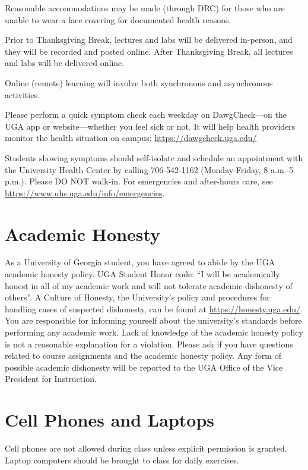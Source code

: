 \documentclass[12pt]{article}
\begin{document}
Reasonable accommodations may be made (through DRC) for those who are
unable to wear a face covering for documented health reasons. 

Prior to Thanksgiving Break, lectures and labs will be delivered
in-person, and they will be recorded and posted online. After
Thanksgiving Break, all lectures and labs will be delivered online. 

Online (remote) learning will involve both synchronous and
asynchronous activities.


Please perform a quick symptom check each weekday on DawgCheck—on the
UGA app or website—whether you feel sick or not. It will help health
providers monitor the health situation on campus:
\url{https://dawgcheck.uga.edu/}


Students showing symptoms should self-isolate and schedule an
appointment with the University Health Center by calling 706-542-1162
(Monday-Friday, 8 a.m.-5 p.m.). Please DO NOT walk-in. For emergencies
and after-hours care, see
\url{https://www.uhs.uga.edu/info/emergencies}.  



\vspace{-2mm}
\section*{\normalsize Academic Honesty}
\vspace{-4mm}
As a University of Georgia student, you have agreed to abide by the
UGA academic honesty policy. UGA Student Honor code: “I will be
academically honest in all of my academic work and will not tolerate
academic dishonesty of others”. A Culture of Honesty, the University's
policy and procedures for handling cases of suspected dishonesty, can
be found at \url{https://honesty.uga.edu/}. You are responsible for
informing yourself about the university’s standards before performing
any academic work. Lack of knowledge of the academic honesty policy is
not a reasonable explanation for a violation. Please ask if you have
questions related to course assignments and the academic honesty
policy. Any form of possible academic dishonesty will be reported to
the UGA Office of the Vice President for Instruction.


\vspace{-2mm}
\section*{\normalsize Cell Phones and Laptops}
\vspace{-4mm}
Cell phones are not allowed during class unless explicit permission is
granted. Laptop computers should be brought to class for daily
exercises.
\end{document}
